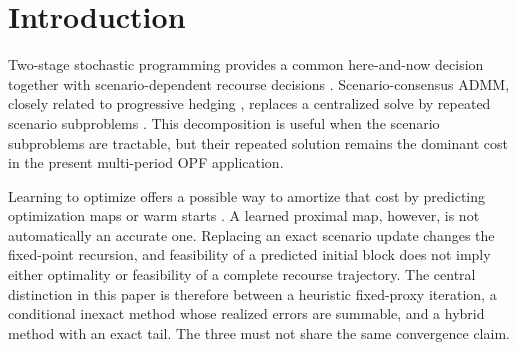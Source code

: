\documentclass[preprint,12pt,3p]{elsarticle}
\theoremstyle{definition}
\begin{document}
\section{Introduction}
Two-stage stochastic programming provides a common here-and-now decision together with scenario-dependent recourse decisions \cite{birge2011introduction,shapiro2009lectures}. Scenario-consensus ADMM, closely related to progressive hedging \cite{rockafellar1991scenarios}, replaces a centralized solve by repeated scenario subproblems \cite{eckstein1992douglas,boyd2011distributed}. This decomposition is useful when the scenario subproblems are tractable, but their repeated solution remains the dominant cost in the present multi-period OPF application.

Learning to optimize offers a possible way to amortize that cost by predicting optimization maps or warm starts \cite{chen2022learning,amos2023tutorial,sambharya2024learning}. A learned proximal map, however, is not automatically an accurate one. Replacing an exact scenario update changes the fixed-point recursion, and feasibility of a predicted initial block does not imply either optimality or feasibility of a complete recourse trajectory. The central distinction in this paper is therefore between a heuristic fixed-proxy iteration, a conditional inexact method whose realized errors are summable, and a hybrid method with an exact tail. The three must not share the same convergence claim.
\end{document}
